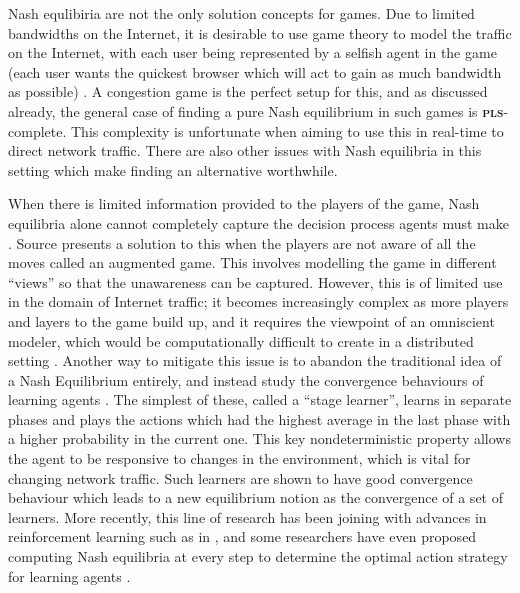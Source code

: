 \documentclass{article}
\begin{document}
Nash equlibiria are not the only solution concepts for games. Due to limited bandwidths on the Internet, it is desirable to use game theory to model the traffic on the Internet, with each user being represented by a selfish agent in the game (each user wants the quickest browser which will act to gain as much bandwidth as possible) \cite{friedman_learning_nodate}. A congestion game is the perfect setup for this, and as discussed already, the general case of finding a pure Nash equilibrium in such games is \textbf{\textsc{pls}}-complete. This complexity is unfortunate when aiming to use this in real-time to direct network traffic. There are also other issues with Nash equilibria in this setting which make finding an alternative worthwhile.

When there is limited information provided to the players of the game, Nash equilibria alone cannot completely capture the decision process agents must make \cite{friedman_learning_nodate, beyond_nash}. Source \cite{beyond_nash} presents a solution to this when the players are not aware of all the moves called an augmented game. This involves modelling the game in different ``views'' so that the unawareness can be captured. However, this is of limited use in the domain of Internet traffic; it becomes increasingly complex as more players and layers to the game build up, and it requires the viewpoint of an omniscient modeler, which would be computationally difficult to create in a distributed setting \cite{friedman_learning_nodate}. Another way to mitigate this issue is to abandon the traditional idea of a Nash Equilibrium entirely, and instead study the convergence behaviours of learning agents \cite{friedman_learning_nodate}. The simplest of these, called a ``stage learner'', learns in separate phases and plays the actions which had the highest average in the last phase with a higher probability in the current one. This key nondeterministic property allows the agent to be responsive to changes in the environment, which is vital for changing network traffic. Such learners are shown to have good convergence behaviour which leads to a new equilibrium notion as the convergence of a set of learners. More recently, this line of research has been joining with advances in reinforcement learning such as in \cite{nowe_game_2012}, and some researchers have even proposed computing Nash equilibria at every step to determine the optimal action strategy for learning agents \cite{lee_nash_2019}.
\end{document}
